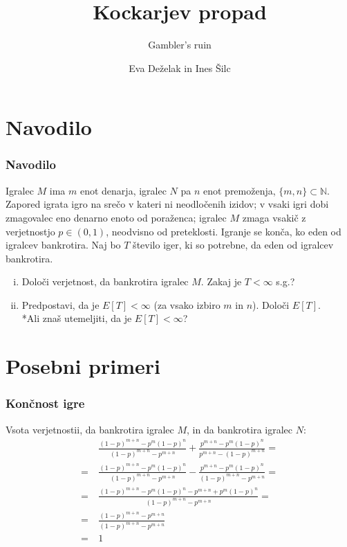 \documentclass[10pt]{beamer}
\begin{document}
\title[Kockarjev propad ]{Kockarjev propad}
\subtitle{Gambler's ruin}
\author{Eva Deželak in Ines Šilc}

\begin{frame}
	\titlepage
\end {frame}
\section[Navodilo]{Navodilo}
\begin{frame}
\frametitle{Navodilo}
Igralec $M$ ima $m$ enot denarja, igralec $N$ pa $n$ enot premoženja, $\{m,n\}\subset \mathbb{N}$. Zapored igrata igro na srečo v kateri ni neodločenih izidov; v vsaki igri dobi zmagovalec eno denarno enoto od poraženca; igralec $M$ zmaga vsakič z verjetnostjo $p\in (0,1)$, neodvisno od preteklosti. Igranje se konča, ko eden od igralcev bankrotira. Naj bo $T$ število iger, ki so potrebne, da eden od igralcev bankrotira. 
\begin{enumerate}[(i)]
\item Določi verjetnost, da bankrotira igralec $M$. Zakaj je  $T<\infty$ s.g.?
\item Predpostavi, da je $E[T]<\infty$ (za vsako izbiro $m$ in $n$). Določi $E[T]$.\\ *Ali znaš utemeljiti, da je $E[T]<\infty$?
\end{enumerate}

\end{frame}


\section[Posebni primeri]{Posebni primeri}
\begin{frame}
\frametitle{Končnost igre}
Vsota verjetnostii, da bankrotira igralec $M$, in da bankrotira igralec $N$:\\
\begin{equation*}
\begin{split}
&~\frac{(1-p)^{m+n}-p^m (1-p)^n}{(1-p)^{m+n}-p^{m+n}}+\frac{p^{m+n}-p^m
   (1-p)^n}{p^{m+n}-(1-p)^{m+n}} =\\
= &~\frac{(1-p)^{m+n}-p^m (1-p)^n}{(1-p)^{m+n}-p^{m+n}}-\frac{p^{m+n}-p^m
   (1-p)^n}{(1-p)^{m+n}-p^{m+n}} =\\
= &~\frac{(1-p)^{m+n}-p^m (1-p)^n-p^{m+n}+p^m
   (1-p)^n}{(1-p)^{m+n}-p^{m+n}} =\\
= &~\frac{(1-p)^{m+n}-p^{m+n}}{(1-p)^{m+n}-p^{m+n}} \\
= &~1
\end{split} 
\end{equation*}

\end{frame}
\end{document}
